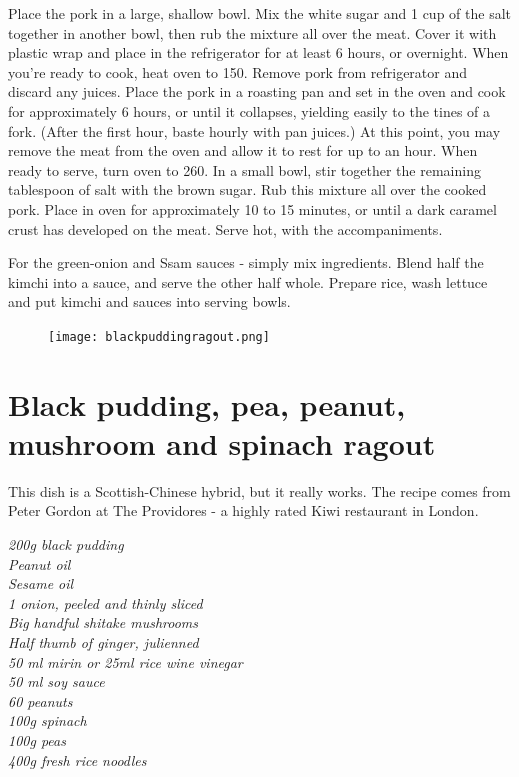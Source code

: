 \documentclass{tufte-book}
\begin{document}
Place the pork in a large, shallow bowl. Mix the white sugar and 1 cup of the salt together in another bowl, then rub the mixture all over the meat. Cover it with plastic wrap and place in the refrigerator for at least 6 hours, or overnight.
When you're ready to cook, heat oven to 150\celsius. Remove pork from refrigerator and discard any juices. Place the pork in a roasting pan and set in the oven and cook for approximately 6 hours, or until it collapses, yielding easily to the tines of a fork. (After the first hour, baste hourly with pan juices.) At this point, you may remove the meat from the oven and allow it to rest for up to an hour.
When ready to serve, turn oven to 260\celsius. In a small bowl, stir together the remaining tablespoon of salt with the brown sugar. Rub this mixture all over the cooked pork. Place in oven for approximately 10 to 15 minutes, or until a dark caramel crust has developed on the meat. Serve hot, with the accompaniments.

For the green-onion and Ssam sauces - simply mix ingredients. 
Blend half the kimchi into a sauce, and serve the other half whole.
Prepare rice, wash lettuce and put kimchi and sauces into serving bowls.

\newpage

\begin{figure}[h]
  \texttt{[image: blackpuddingragout.png]}
\end{figure}

\section{Black pudding, pea, peanut, mushroom and spinach ragout}

This dish is a Scottish-Chinese hybrid, but it really works. The recipe comes from Peter Gordon at The Providores - a highly rated Kiwi restaurant in London.

\smallskip
\emph{200g black pudding
\\Peanut oil
\\Sesame oil
\\1 onion, peeled and thinly sliced
\\Big handful shitake mushrooms
\\Half thumb of ginger, julienned
\\50 ml mirin or 25ml rice wine vinegar
\\50 ml soy sauce
\\60 peanuts
\\100g spinach
\\100g peas
\\400g fresh rice noodles
}
\end{document}
